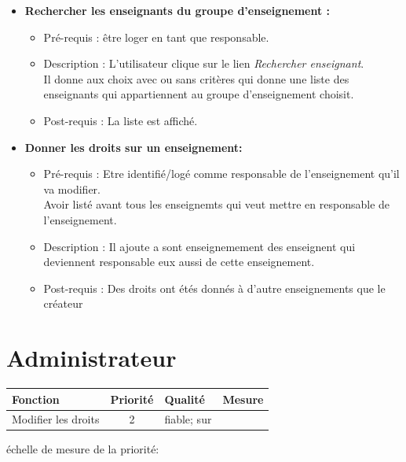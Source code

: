 \begin{itemize}	
\item {\bf Rechercher les enseignants du groupe d'enseignement :}
	\begin{itemize}
	\item Pr{\'e}-requis : {\^e}tre loger en tant que responsable.
	\item Description : L'utilisateur clique sur le lien {\it Rechercher enseignant}.\\
	Il donne aux choix avec ou sans crit{\`e}res qui donne une liste des enseignants qui appartiennent au groupe d'enseignement choisit.
	\item Post-requis : La liste est affich{\'e}.
	\end{itemize}
\item {\bf Donner les droits sur un enseignement:}
	\begin{itemize}
	\item Pr{\'e}-requis : Etre identifi{\'e}/log{\'e} comme responsable de l'enseignement qu'il va modifier.\\
	Avoir list{\'e} avant tous les enseignemts qui veut mettre en responsable de l'enseignement. 
	\item Description : Il ajoute a sont enseignemement des enseignent qui deviennent responsable eux aussi de cette enseignement.
	\item Post-requis : Des droits ont {\'e}t{\'e}s donn{\'e}s {\`a} d'autre enseignements que le cr{\'e}ateur
	\end{itemize}
\end{itemize}

\section*{Administrateur}


\begin{tabular}{|p{4cm}|c|p{4cm}|p{5cm}|}
\hline
  Fonction & Priorit{\'e} & Qualit{\'e} & Mesure \\
\hline
Modifier les droits & 2 & fiable; sur & \\
\hline
\end{tabular}

\begin{center}
{\'e}chelle de mesure de la priorit{\'e}:

\end{center}

